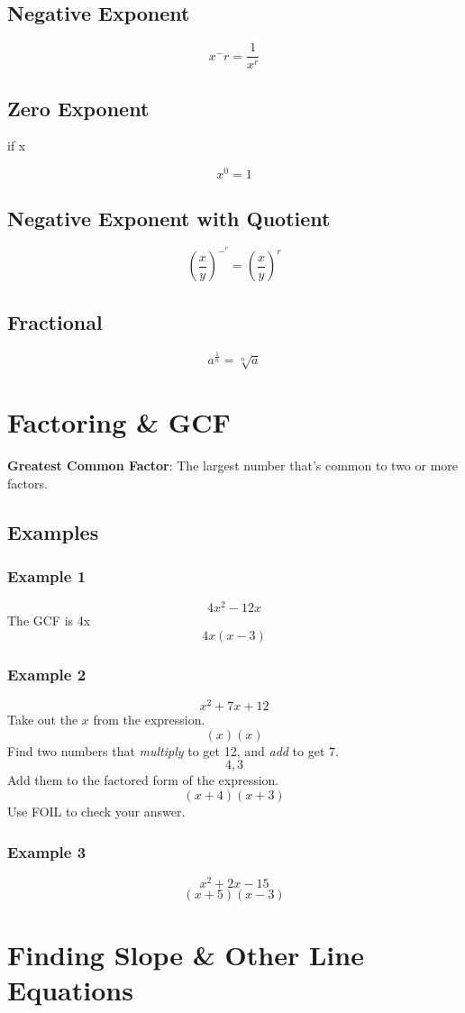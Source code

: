 \documentclass{article}
\begin{document}
\subsection{Negative Exponent}
	$$
	x^-r = \frac{1}{x^r}
	$$
\subsection{Zero Exponent}
	if x 

	$$x^0 = 1$$

\subsection{Negative Exponent with Quotient}
	$$
	\left( \frac{x}{y}\right)^-^r = \left(\frac{x}{y}\right)^r
	$$

\subsection{Fractional}
	$$
	a^\frac{1}{n} = \sqrt[n]{a}	
	$$

\section{Factoring \& GCF}
\noindent \textbf{Greatest Common Factor}: The largest number that's common to two or more factors.
\subsection{Examples}
\subsubsection{Example 1}
$$4x^2 - 12x$$
The GCF is 4x
$$4x(x-3)$$

\subsubsection{Example 2}
$$x^2 + 7x + 12$$
Take out the $x$ from the expression.
$$(x)(x)$$
Find two numbers that \textit{multiply} to get 12, and \textit{add} to get 7.
$$4, 3$$
Add them to the factored form of the expression.
$$(x + 4)(x + 3)$$
Use FOIL to check your answer.

\subsubsection{Example 3}
$$x^2 + 2x - 15$$
$$(x+5)(x-3)$$

\section{Finding Slope \& Other Line Equations}
\end{document}
